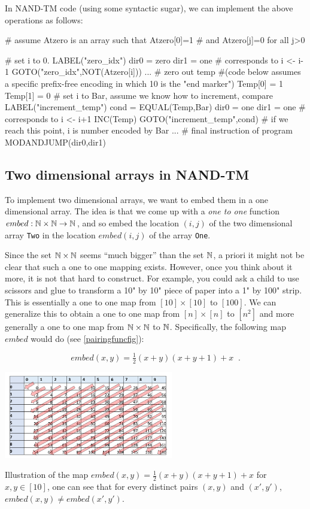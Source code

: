 In NAND-TM code (using some syntactic sugar), we can implement the above
operations as follows:

\begin{code}
# assume Atzero is an array such that Atzero[0]=1
# and Atzero[j]=0 for all j>0

# set i to 0.
LABEL("zero_idx")
dir0 = zero
dir1 = one
# corresponds to i <- i-1
GOTO("zero_idx",NOT(Atzero[i]))
...
# zero out temp
#(code below assumes a specific prefix-free encoding in which 10 is the "end marker")
Temp[0] = 1
Temp[1] = 0
# set i to Bar, assume we know how to increment, compare
LABEL("increment_temp")
cond = EQUAL(Temp,Bar)
dir0 = one
dir1 = one
# corresponds to i <- i+1
INC(Temp)
GOTO("increment_temp",cond)
# if we reach this point, i is number encoded by Bar
...
# final instruction of program
MODANDJUMP(dir0,dir1)
\end{code}

\subsection{Two dimensional arrays in
NAND-TM}\label{Two-dimensional-arrays-in}

To implement two dimensional arrays, we want to embed them in a one
dimensional array. The idea is that we come up with a \emph{one to one}
function \(embed:{\mathbb{N}} \times {\mathbb{N}} \rightarrow {\mathbb{N}}\), and so embed the
location \((i,j)\) of the two dimensional array \texttt{Two} in the
location \(embed(i,j)\) of the array \texttt{One}.

Since the set \({\mathbb{N}} \times {\mathbb{N}}\) seems ``much bigger'' than the set
\({\mathbb{N}}\), a priori it might not be clear that such a one to one mapping
exists. However, once you think about it more, it is not that hard to
construct. For example, you could ask a child to use scissors and glue
to transform a 10" by 10" piece of paper into a 1" by 100" strip. This
is essentially a one to one map from \([10]\times [10]\) to \([100]\).
We can generalize this to obtain a one to one map from \([n]\times [n]\)
to \([n^2]\) and more generally a one to one map from \({\mathbb{N}} \times {\mathbb{N}}\)
to \({\mathbb{N}}\). Specifically, the following map \(embed\) would do (see
\cref{pairingfuncfig}):

\[embed(x,y) = \tfrac{1}{2}(x+y)(x+y+1)+x\;\;.\]


\begin{marginfigure}
\centering
\includegraphics[width=\linewidth, height=1.5in, keepaspectratio]{../figure/pairing_function.png}
\caption{Illustration of the map
\(embed(x,y) = \tfrac{1}{2}(x+y)(x+y+1)+x\) for \(x,y \in [10]\), one
can see that for every distinct pairs \((x,y)\) and \((x',y')\),
\(embed(x,y) \neq embed(x',y')\).}
\label{pairingfuncfig}
\end{marginfigure}

